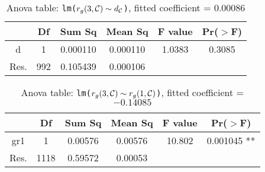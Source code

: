 \begin{table}
\caption{Anova table: \texttt{lm($r_g(3,\mathcal{C})\sim d_{\mathcal{C}}$)}, fitted coefficient = $0.00086$}
\begin{center}
\begin{tabular}{c|c|c|c|c|c}
         &   {\small Df } &  {\small Sum Sq} &  {\small Mean Sq} & {\small  F value} &   {\small  Pr($>$F)  }  \\ \hline
 {\small d     }   &   {\small  1} &  {\small 0.000110 }&  {\small 0.000110 }&  {\small 1.0383}& {\small  0.3085 }\\ \hline
 {\small Res. }&  {\small 992 }& {\small  0.105439} & {\small  0.000106  }         &
\end{tabular}
\end{center}
\label{tb:g3_vs_d}
\end{table}%



\begin{table}
\caption{Anova table: \texttt{lm($r_g(3,\mathcal{C}) \sim r_g(1,\mathcal{C})$)}, fitted coefficient = $-0.14085$}
\begin{center}
\begin{tabular}{c|c|c|c|c|c}
         & {\small   Df } &  {\small Sum Sq} & {\small  Mean Sq }&  {\small F value} &    {\small Pr($>$F)  }  \\ \hline
 {\small gr1   }&       {\small 1} &  {\small 0.00576 }&  {\small 0.00576}  &  {\small 10.802 }& {\small  0.001045 **}\\ \hline
 {\small Res. }&  {\small 1118} & {\small  0.59572 }& {\small  0.00053       }  &  \\
\end{tabular}
\end{center}
\label{tb:anova_g6_vs_g1}
\end{table}%






